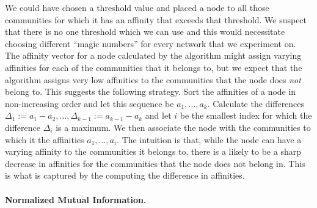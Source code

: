 We could have chosen a threshold value and placed a node to all those communities for which 
it has an affinity that exceeds that threshold. We suspect that there is no one threshold 
which we can use and this would necessitate choosing different ``magic numbers'' for every network 
that we experiment on. The affinity vector for a node calculated by the 
algorithm might assign varying affinities for each of the communities that it belongs to, but we expect 
that the algorithm assigns very low affinities to the communities that the node does \emph{not} belong to. 
This suggests the following strategy. Sort the affinities of a node in non-increasing order and let this 
sequence be $a_1, \ldots, a_k$. Calculate the differences $\Delta_{1} := a_1 - a_2, \ldots, 
\Delta_{k-1} := a_{k - 1} - a_k$ and let $i$ be the smallest index for which the difference $\Delta_i$ is 
a maximum. We then associate the node with the communities to which it the affinities $a_1, \ldots, a_i$. 
The intuition is that, while the node can have a varying affinity to the communities it belongs to, 
there is a likely to be a sharp decrease in affinities for the communities that the node does 
not belong in. This is what is captured by the computing the difference in affinities.

\paragraph{Normalized Mutual Information.}
